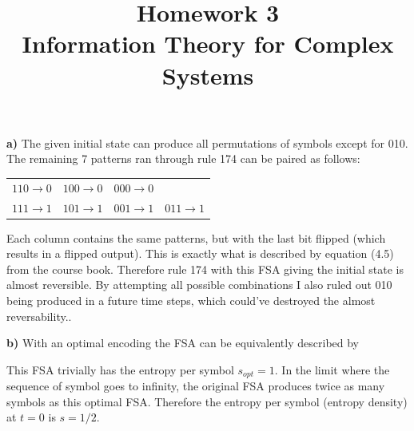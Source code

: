 \documentclass[a4paper, 12pt]{article}
\begin{document}
\title{\vspace{-6em}\textbf{Homework 3}\\ \Large Information Theory for Complex Systems \vspace{-1em}}
\author{}
\date{\vspace{-3.2em}}


\maketitle

\textbf{a)} The given initial state can produce all permutations of symbols except for 010. The remaining 7 patterns ran through rule 174 can be paired as follows:
\begin{table}[ht!]
    \centering
    \begin{tabular}{|c|c|c|c|}
        $110 \rightarrow 0$ & $100 \rightarrow 0$ & $000 \rightarrow 0$ & \\
        $111 \rightarrow 1$ & $101 \rightarrow 1$ & $001 \rightarrow 1$ & $011 \rightarrow 1$
    \end{tabular}
\end{table}
Each column contains the same patterns, but with the last bit flipped (which results in a flipped output). This is exactly what is described by equation (4.5) from the course book. Therefore rule 174 with this FSA giving the initial state is almost reversible. By attempting all possible combinations I also ruled out 010 being produced in a future time steps, which could've destroyed the almost reversability..

\textbf{b)} With an optimal encoding the FSA can be equivalently described by
\vspace{-1.5em}
\begin{figure}[ht]
\begin{center}
\end{center}
\end{figure}

\vspace{-1.5em}
This FSA trivially has the entropy per symbol $s_{opt} = 1$. In the limit where the sequence of symbol goes to infinity, the original FSA produces twice as many symbols as this optimal FSA. Therefore the entropy per symbol (entropy density) at $t = 0$ is $s = 1/2$.
\end{document}

